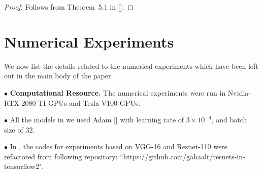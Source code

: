 \begin{proof}
Follows from Theorem~5.1 in [].
\end{proof}


\section{Numerical Experiments}
We now list the details related to the numerical experiments which have been left out in the main body of the paper.

\indent \quad $\bullet$ \textbf{Computational Resource.} The numerical experiments were run in Nvidia-RTX 2080 TI GPUs and Tesla V100 GPUs.

\indent \quad $\bullet$ All the models in  we used Adam [] with learning rate of $3\times 10^{-4}$, and batch size of 32.

\indent \quad $\bullet$ In , the codes for experiments based on VGG-16 and Resnet-110  were refactored from following repository: ``https://github.com/gahaalt/resnets-in-tensorflow2".

